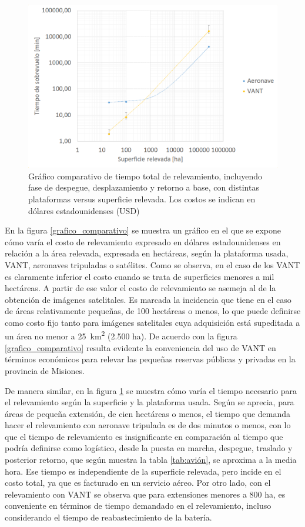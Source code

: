 \begin{figure}[h!]
    \includegraphics[width=\textwidth]{Imagenes/grafico bloque 1-II.png}
     \hfill
     \caption{Gráfico comparativo de tiempo total de relevamiento, incluyendo fase de despegue, desplazamiento y retorno a base, con distintas plataformas versus superficie relevada. Los costos se indican en dólares estadounidenses (USD)}
    \label{grafico_comparativo-II}
\end{figure}

En la figura \ref{grafico_comparativo} se muestra un gráfico en el que se expone cómo varía el costo de relevamiento expresado en dólares estadounidenses en relación a la área relevada, expresada en hectáreas, según la plataforma usada, VANT, aeronaves tripuladas o satélites. Como se observa, en el caso de los VANT es claramente inferior el costo cuando se trata de superficies menores a mil hectáreas. A partir de ese valor el costo de relevamiento se asemeja al de la obtención de imágenes satelitales. Es marcada la incidencia que tiene en el caso de áreas relativamente pequeñas, de 100 hectáreas o menos, lo que puede definirse como costo fijo tanto para imágenes satelitales cuya adquisición está supeditada a un área no menor a \SI{25}{\kilo\metre\squared} (2.500 ha). De acuerdo con la figura \ref{grafico_comparativo} resulta evidente la conveniencia del uso de VANT en términos económicos para relevar las pequeñas reservas públicas y privadas en la provincia de Misiones.

De manera similar, en la figura \ref{grafico_comparativo-II} se muestra cómo varía el tiempo necesario para el relevamiento según la superficie y la plataforma usada. Según se aprecia, para áreas de pequeña extensión, de cien hectáreas o menos, el tiempo que demanda hacer el relevamiento con aeronave tripulada es de dos minutos o menos, con lo que el tiempo de relevamiento es insignificante en comparación al tiempo que podría definirse como logístico, desde la puesta en marcha, despegue, traslado y posterior retorno, que según muestra la tabla \ref{tab:avión}, se aproxima a la media hora. Ese tiempo es independiente de la superficie relevada, pero incide en el costo total, ya que es facturado en un servicio aéreo. Por otro lado, con el relevamiento con VANT se observa que para extensiones menores a 800 ha, es conveniente en términos de tiempo demandado en el relevamiento, incluso considerando el tiempo de reabastecimiento de la batería.


